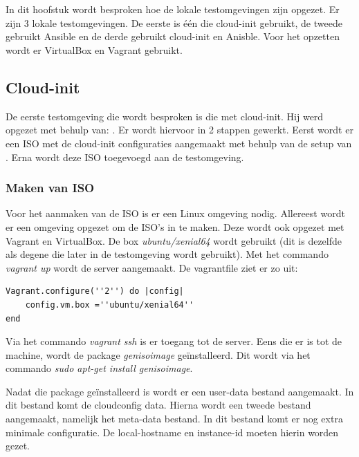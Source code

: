 \chapter{}
\label{ch:testlokaal}

In dit hoofstuk wordt besproken hoe de lokale testomgevingen zijn opgezet. Er zijn 3 lokale testomgevingen. De eerste is één die cloud-init gebruikt, de tweede gebruikt Ansible en de derde gebruikt cloud-init en Anisble. Voor het opzetten wordt er VirtualBox en Vagrant gebruikt.

\section{Cloud-init}
De eerste testomgeving die wordt besproken is die met cloud-init. Hij werd opgezet met behulp van: \autocite{cloudVagrant}. Er wordt hiervoor in 2 stappen gewerkt. Eerst wordt er een ISO met de cloud-init configuraties aangemaakt met behulp van de setup van \autocite{cloudVagrant}. Erna wordt deze ISO toegevoegd aan de testomgeving.

\subsection{Maken van ISO}
Voor het aanmaken van de ISO is er een Linux omgeving nodig. Allereest wordt er een omgeving opgezet om de ISO's in te maken. Deze wordt ook opgezet met Vagrant en VirtualBox. De box \textit{ubuntu/xenial64} wordt gebruikt (dit is dezelfde als degene die later in de testomgeving wordt gebruikt). Met het commando \textit{vagrant up} wordt de server aangemaakt. De vagrantfile ziet er zo uit:
\begin{lstlisting}
Vagrant.configure(''2'') do |config|
	config.vm.box =''ubuntu/xenial64''
end
\end{lstlisting}

Via het commando \textit{vagrant ssh} is er toegang tot de server. Eens die er is tot de machine, wordt de package \textit{genisoimage} geïnstalleerd. Dit wordt via het commando \textit{sudo apt-get install genisoimage}. 

Nadat die package geïnstalleerd is wordt er een user-data bestand aangemaakt. In dit bestand komt de cloudconfig data. Hierna wordt een tweede bestand aangemaakt, namelijk het meta-data bestand. In dit bestand komt er nog extra minimale configuratie. De local-hostname en instance-id moeten hierin worden gezet.


